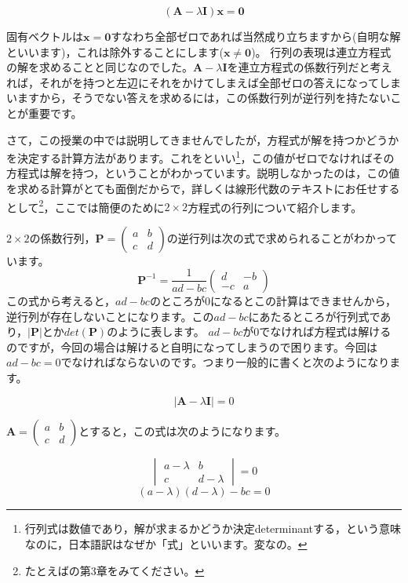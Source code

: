 \documentclass{ltjsbook}
\begin{document}
\[ (\bm{A} - \lambda\bm{I})\bm{x} = \bm{0} \]

固有ベクトルは$\bm{x}=\bm{0}$すなわち全部ゼロであれば当然成り立ちますから(自明な解といいます)，これは除外することにします($\bm{x}\neq \bm{0}$)。
行列の表現は連立方程式の解を求めることと同じなのでした。$\bm{A} - \lambda\bm{I}$を連立方程式の係数行列だと考えれば，それがを持つと左辺にそれをかけてしまえば全部ゼロの答えになってしまいますから，そうでない答えを求めるには，この係数行列が逆行列を持たないことが重要です。

さて，この授業の中では説明してきませんでしたが，方程式が解を持つかどうかを決定する計算方法があります。これをといい\footnote{行列式は数値であり，解が求まるかどうか決定determinantする，という意味なのに，日本語訳はなぜか「式」といいます。変なの。}，この値がゼロでなければその方程式は解を持つ，ということがわかっています。説明しなかったのは，この値を求める計算がとても面倒だからで，詳しくは線形代数のテキストにお任せするとして\footnote{たとえば\textcite{Murakami20160301}の第3章をみてください。}，ここでは簡便のために$2\times2$方程式の行列について紹介します。

$2 \times 2$の係数行列，$\bm{P}=\begin{pmatrix} a&b\\c&d \end{pmatrix}$の逆行列は次の式で求められることがわかっています。
\[ \bm{P}^{-1}= \frac{1}{ad-bc}\begin{pmatrix}d & -b \\ -c &a \end{pmatrix} \]
この式から考えると，$ad - bc$のところが0になるとこの計算はできませんから，逆行列が存在しないことになります。この$ad-bc$にあたるところが行列式であり，$|\bm{P}|$とか$det(\bm{P})$のように表します。
$ad-bc$が0でなければ方程式は解けるのですが，今回の場合は解けると自明になってしまうので困ります。今回は$ad-bc=0$でなければならないのです。つまり一般的に書くと次のようになります。

\[ | \bm{A} - \lambda \bm{I} | = 0 \]

$\bm{A} = \begin{pmatrix} a & b \\ c & d \end{pmatrix} $とすると，この式は次のようになります。

\[   \begin{vmatrix} a-\lambda & b \\ c & d - \lambda \end{vmatrix} = 0 \]
\[ (a-\lambda)(d-\lambda) - bc = 0 \]
\end{document}
